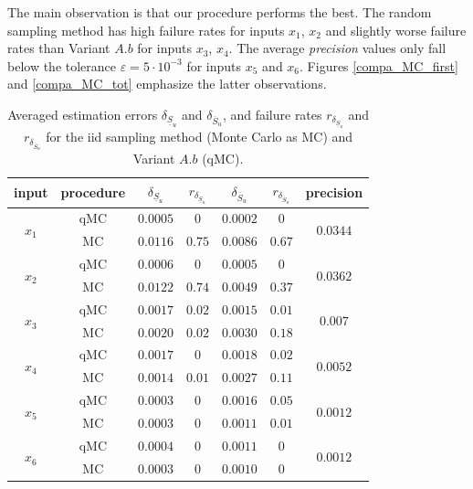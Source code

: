 The main observation is that our procedure performs the best. The random sampling method has high failure rates for inputs $x_1$, $x_2$ and slightly worse failure rates than Variant $A.b$ for inputs $x_3$, $x_4$. The average \textit{precision} values only fall below the tolerance $\varepsilon=5\cdot10^{-3}$ for inputs $x_5$ and $x_6$. Figures \ref{compa_MC_first} and \ref{compa_MC_tot} emphasize the latter observations.


\begin{table}[t]
\caption{Averaged estimation errors $\delta_{\underline{S}_u}$ and $\delta_{\overline{S}_u}$, and failure rates $r_{\delta_{\underline{S}_u}}$ and $r_{\delta_{\overline{S}_u}}$ for the iid sampling method (Monte Carlo as MC) and Variant $A.b$ (qMC).}
\centering
\begin{tabular}{ccccccc}
\hline
 input & procedure & $\delta_{\underline{S}_u}$ & $r_{\delta_{\underline{S}_u}}$ & $\delta_{\overline{S}_u}$ &$r_{\delta_{\overline{S}_u}}$ & precision \\
\hline
\multirow{2}{*}{$x_1$} & qMC & $0.0005$ & $0$ & $0.0002$ & $0$ & \multirow{2}{*}{$0.0344$} \\
& MC & $0.0116$ & $0.75$ & $0.0086$ & $0.67$ & \\
\hline
\multirow{2}{*}{$x_2$} & qMC & $0.0006$ & $0$ & $0.0005$ & $0$ & \multirow{2}{*}{$0.0362$} \\
& MC & $0.0122$ & $0.74$ & $0.0049$ & $0.37$ & \\
\hline
\multirow{2}{*}{$x_3$} & qMC & $0.0017$ & $0.02$ & $0.0015$ & $0.01$ & \multirow{2}{*}{$0.007$} \\
& MC & $0.0020$ & $0.02$ & $0.0030$ & $0.18$ & \\
\hline
\multirow{2}{*}{$x_4$} & qMC & $0.0017$ & $0$ & $0.0018$ & $0.02$ & \multirow{2}{*}{$0.0052$} \\
& MC & $0.0014$ & $0.01$ & $0.0027$ & $0.11$ & \\
\hline
\multirow{2}{*}{$x_5$} & qMC & $0.0003$ & $0$ & $0.0016$ & $0.05$ & \multirow{2}{*}{$0.0012$} \\
& MC & $0.0003$ & $0$ & $0.0011$ & $0.01$ & \\
\hline
\multirow{2}{*}{$x_6$} & qMC & $0.0004$ & $0$ & $0.0011$ & $0$ & \multirow{2}{*}{$0.0012$} \\
& MC & $0.0003$ & $0$ & $0.0010$ & $0$ & \\
\hline
\end{tabular}
\label{compa_MC}
\end{table}

